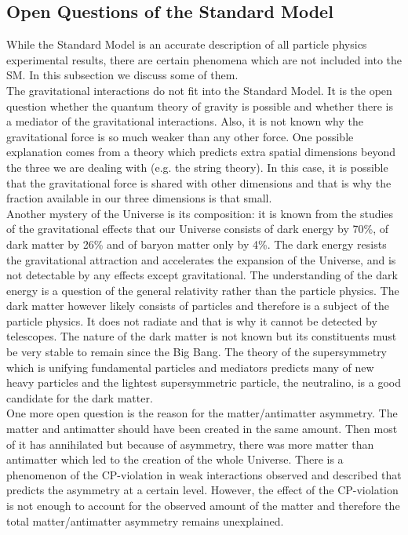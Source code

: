 \subsection{Open Questions of the Standard Model}


While the Standard Model is an accurate description of all particle physics experimental results, there are certain phenomena which are not included into the SM. In this subsection we discuss some of them.\\

The gravitational interactions do not fit into the Standard Model. It is the open question whether the quantum theory of gravity is possible and whether there is a mediator of the gravitational interactions. Also, it is not known why the gravitational force is so much weaker than any other force. One possible explanation comes from a theory which predicts extra spatial dimensions beyond the three we are dealing with (e.g. the string theory). In this case, it is possible that the gravitational force is shared with other dimensions and that is why the fraction available in our three dimensions is that small.\\

Another mystery of the Universe is its composition: it is known from the studies of the gravitational effects that our Universe consists of dark energy by 70\%, of dark matter by 26\% and of baryon matter only by 4\%. The dark energy resists the gravitational attraction and accelerates the expansion of the Universe, and is not detectable by any effects except gravitational. The understanding of the dark energy is a question of the general relativity rather than the particle physics. The dark matter however likely consists of particles and therefore is a subject of the particle physics. It does not radiate and that is why it cannot be detected by telescopes. The nature of the dark matter is not known but its constituents must be very stable to remain since the Big Bang. The theory of the supersymmetry which is unifying fundamental particles and mediators predicts many of new heavy particles and the lightest supersymmetric particle, the neutralino, is a good candidate for the dark matter.\\

One more open question is the reason for the matter/antimatter asymmetry. The matter and antimatter should have been created in the same amount. Then most of it has annihilated but because of asymmetry, there was more matter than antimatter which led to the creation of the whole Universe. There is a phenomenon of the CP-violation in weak interactions observed and described that predicts the asymmetry at a certain level. However, the effect of the CP-violation is not enough to account for the observed amount of the matter and therefore the total matter/antimatter asymmetry remains unexplained. \\


